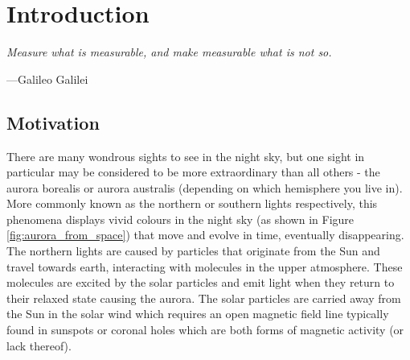 
\chapter{Introduction} %

\label{Chapter1} %


\newcommand{\keyword}[1]{\textbf{#1}}
\newcommand{\tabhead}[1]{\textbf{#1}}
\newcommand{\code}[1]{\texttt{#1}}
\newcommand{\file}[1]{\texttt{\bfseries#1}}
\newcommand{\option}[1]{\texttt{\itshape#1}}

\newcommand{\ts}{\textsuperscript}
\newcommand{\caII}{Ca II H \& K\xspace}
\newcommand{\Rprime}{$R^{'}_{HK}$\xspace}
\newcommand{\Smw}{$S_{MW}$\xspace}

\newcommand{\esp}{\textit{ESPaDOnS}\xspace}
\newcommand{\narval}{\textit{NARVAL}\xspace}
\newcommand{\Halpha}{H-$\alpha$\xspace}


\epigraph{\itshape Measure what is measurable, and make measurable what is not so.}{---Galileo Galilei}

\section{Motivation}

There are many wondrous sights to see in the night sky, but one sight in particular may be considered to be more extraordinary than all others - the aurora borealis or aurora australis (depending on which hemisphere you live in). More commonly known as the northern or southern lights respectively, this phenomena displays vivid colours in the night sky (as shown in Figure \ref{fig:aurora_from_space}) that move and evolve in time, eventually disappearing. The northern lights are caused by particles that originate from the Sun and travel towards earth, interacting with molecules in the upper atmosphere. These molecules are excited by the solar particles and emit light when they return to their relaxed state causing the aurora. The solar particles are carried away from the Sun in the solar wind \citep{Parker_1958} which requires an open magnetic field line typically found in sunspots or coronal holes which are both forms of magnetic activity (or lack thereof).

